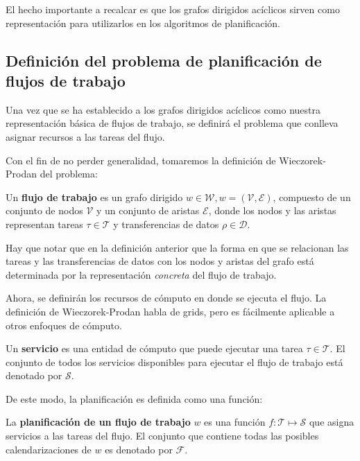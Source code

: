 El hecho importante a recalcar es que los grafos dirigidos acíclicos sirven como representación para utilizarlos en los algoritmos de planificación.


\subsection{Definición del problema de planificación de flujos de trabajo}
Una vez que se ha establecido a los grafos dirigidos acíclicos como nuestra representación básica de flujos de trabajo, se definirá el problema que conlleva asignar recursos a las tareas del flujo.

Con el fin de no perder generalidad, tomaremos la definición de Wieczorek-Prodan \cite{wieczorek2008taxonomies} del problema:

\begin{defn}
Un \textbf{flujo de trabajo} es un grafo dirigido $w \in \mathcal{W}, w = (\mathcal{V},\mathcal{E})$, compuesto de un conjunto de nodos $\mathcal{V}$ y un conjunto de aristas $\mathcal{E}$, donde los nodos y las aristas representan tareas $ \tau \in \mathcal{T}$ y transferencias de datos $ \rho \in \mathcal{D}$.
\end{defn}

Hay que notar que en la definición anterior que la forma en que se relacionan las tareas y las transferencias de datos con los nodos y aristas del grafo está determinada por la representación \emph{concreta} del flujo de trabajo.

Ahora, se definirán los recursos de cómputo en donde se ejecuta el flujo. La definición de Wieczorek-Prodan habla de grids, pero es fácilmente aplicable a otros enfoques de cómputo.

\begin{defn}
Un \textbf{servicio} es una entidad de cómputo que puede ejecutar una tarea $\tau \in \mathcal{T}$. El conjunto de todos los servicios disponibles para ejecutar el flujo de trabajo está denotado por $\mathcal{S}$.
\end{defn}

De este modo, la planificación es definida como una función:

\begin{defn}
La \textbf{planificación de un flujo de trabajo} $w$ es una función $ f: \mathcal{T} \mapsto \mathcal{S}$ que asigna servicios a las tareas del flujo. El conjunto que contiene todas las posibles calendarizaciones de $w$ es denotado por $\mathcal{F}$.
\end{defn}

